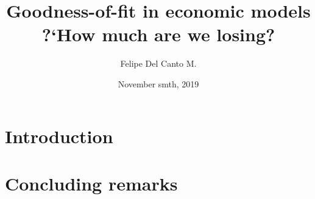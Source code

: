 \documentclass[english, a4paper,12pt]{article}
\author{Felipe Del Canto M.}
\title{Goodness-of-fit in economic models \\ ?`How much are we losing?}
\date{November smth, 2019}
\begin{document}
\maketitle
\thispagestyle{empty}

\vfill
\abstract{}
\vfill


\newpage
\section{Introduction}


\section{Concluding remarks}



\end{document}
